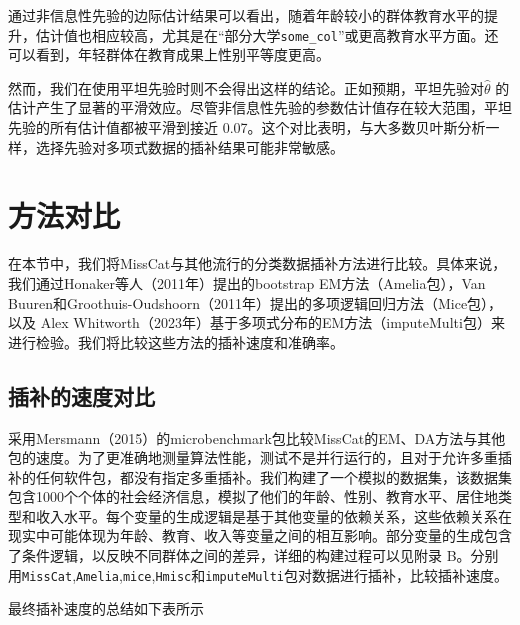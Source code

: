 \documentclass[12pt,hyperref,a4paper,UTF8]{ctexart}
\begin{document}
  通过非信息性先验的边际估计结果可以看出，随着年龄较小的群体教育水平的提升，估计值也相应较高，尤其是在“部分大学\texttt{some\_col}”或更高教育水平方面。还可以看到，年轻群体在教育成果上性别平等度更高。

然而，我们在使用平坦先验时则不会得出这样的结论。正如预期，平坦先验对$\hat{\theta}$ 的估计产生了显著的平滑效应。尽管非信息性先验的参数估计值存在较大范围，平坦先验的所有估计值都被平滑到接近 0.07。这个对比表明，与大多数贝叶斯分析一样，选择先验对多项式数据的插补结果可能非常敏感。

\section{方法对比}
  
  在本节中，我们将MissCat与其他流行的分类数据插补方法进行比较。具体来说，我们通过Honaker等人（2011年）提出的bootstrap EM方法（Amelia包），Van Buuren和Groothuis-Oudshoorn（2011年）提出的多项逻辑回归方法（Mice包），以及 Alex Whitworth（2023年）基于多项式分布的EM方法（imputeMulti包）来进行检验。我们将比较这些方法的插补速度和准确率。
  
  
  \subsection{插补的速度对比}
  
  采用Mersmann（2015）的microbenchmark包比较MissCat的EM、DA方法与其他包的速度。为了更准确地测量算法性能，测试不是并行运行的，且对于允许多重插补的任何软件包，都没有指定多重插补。我们构建了一个模拟的数据集，该数据集包含1000个个体的社会经济信息，模拟了他们的年龄、性别、教育水平、居住地类型和收入水平。每个变量的生成逻辑是基于其他变量的依赖关系，这些依赖关系在现实中可能体现为年龄、教育、收入等变量之间的相互影响。部分变量的生成包含了条件逻辑，以反映不同群体之间的差异，详细的构建过程可以见附录 B。分别用\texttt{MissCat},\texttt{Amelia},\texttt{mice},\texttt{Hmisc}和\texttt{imputeMulti}包对数据进行插补，比较插补速度。

  最终插补速度的总结如下表所示
 
\end{document}
